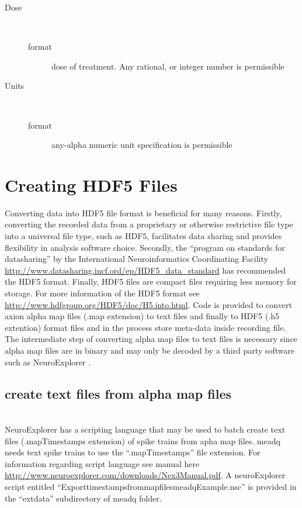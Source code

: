 \documentclass{article}\usepackage[]{graphicx}\usepackage[]{color}
\begin{document}
\begin{description}
\item[Dose] \mbox{}\\
\begin{description}
\item[format] dose of treatment. Any rational, or integer number is permissible 
\end{description}

\item[Units] \mbox{}\\
\begin{description}
\item[format] any-alpha numeric unit specification is permissible 
\end{description}

\end{description}






\section*{Creating HDF5 Files}
Converting data into HDF5 file format is beneficial for many reasons. Firstly, converting the recorded data from a proprietary or otherwise restrictive file type into a universal file type, such as HDF5, facilitates data sharing and provides flexibility in analysis software choice.  Secondly, the ``program on standards for datasharing'' by the International Neuroinformatics Coordinating Facility \url{ http://www.datasharing.incf.ord/ep/HDF5_data_standard} has recommended the HDF5 format. Finally, HDF5 files are compact files requiring less memory for storage. For more information of the HDF5 format see \url{http://www.hdfgroup.org/HDF5/doc/H5.into.html}.
 Code is provided to convert axion alpha map files (.map extension) to text files and finally to HDF5 (.h5 extention) format files and in the process store meta-data inside recording file. The intermediate step of converting alpha map files to text files is necessary since alpha map files are in binary and may only be decoded by a third party software such as NeuroExplorer \citep{neuroexplorer}.

\subsection{create text files from alpha map files} \mbox{}\\
NeuroExplorer has a scripting language that may be used to batch create text files (.mapTimestamps extension) of spike trains from apha map files.  meadq needs text spike trains to use the ``.mapTimestamps'' file extension.  For information regarding script language see manual
here \url{http://www.neuroexplorer.com/downloads/Nex3Manual.pdf}.  A neuroExplorer script entitled ``Export\textunderscore timestamps\textunderscore from\textunderscore map\textunderscore files\textunderscore meadqExample.nsc'' is provided in the ``extdata'' subdirectory of
meadq folder. 
\end{document}
